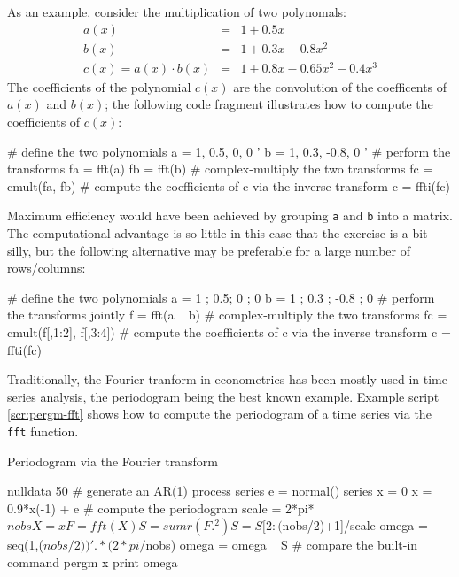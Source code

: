 As an example, consider the multiplication of two polynomals:
\begin{eqnarray*}
  a(x) & = & 1 + 0.5 x \\
  b(x) & = & 1 + 0.3 x - 0.8 x^2 \\
  c(x) = a(x) \cdot b(x) & = & 1 + 0.8 x - 0.65 x^2 - 0.4 x^3
\end{eqnarray*}
The coefficients of the polynomial $c(x)$ are the convolution of the
coefficents of $a(x)$ and $b(x)$; the following  code fragment
illustrates how to compute the coefficients of $c(x)$:
\begin{code}
# define the two polynomials
a = { 1, 0.5, 0, 0 }'
b = { 1, 0.3, -0.8, 0 }'
# perform the transforms
fa = fft(a)
fb = fft(b)
# complex-multiply the two transforms 
fc = cmult(fa, fb)
# compute the coefficients of c via the inverse transform
c = ffti(fc)
\end{code}

Maximum efficiency would have been achieved by grouping \texttt{a} and
\texttt{b} into a matrix.  The computational advantage is so little in
this case that the exercise is a bit silly, but the following
alternative may be preferable for a large number of
rows/columns:
\begin{code}
# define the two polynomials
a = { 1 ; 0.5; 0 ; 0 }
b = { 1 ; 0.3 ; -0.8 ; 0 }
# perform the transforms jointly
f = fft(a ~ b)
# complex-multiply the two transforms 
fc = cmult(f[,1:2], f[,3:4])
# compute the coefficients of c via the inverse transform
c = ffti(fc)
\end{code}

Traditionally, the Fourier tranform in econometrics has been mostly
used in time-series analysis, the periodogram being the best known
example. Example script \ref{scr:pergm-fft} shows how to compute the
periodogram of a time series via the \texttt{fft} function.

\begin{script}[htbp]
  \caption{Periodogram via the Fourier transform}
  \label{scr:pergm-fft}
\begin{scode}
nulldata 50
# generate an AR(1) process
series e = normal()
series x = 0
x = 0.9*x(-1) + e
# compute the periodogram
scale = 2*pi*$nobs
X = { x }
F = fft(X)
S = sumr(F.^2)
S = S[2:($nobs/2)+1]/scale
omega = seq(1,($nobs/2))' .* (2*pi/$nobs)
omega = omega ~ S
# compare the built-in command
pergm x  
print omega
\end{scode}
\end{script}

